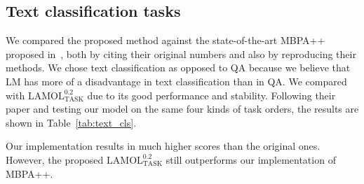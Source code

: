 \documentclass{article} %
\begin{document}


%

\subsection{Text classification tasks}
We compared the proposed method against the state-of-the-art MBPA++ proposed in~\citet{d2019episodic}, both by citing their original numbers and also by reproducing their methods.
We chose text classification as opposed to QA because we believe that LM has more of a disadvantage in text classification than in QA.
We compared with $\text{LAMOL}_{\text{TASK}}^{0.2}$ due to its good performance and stability.
Following their paper and testing our model on the same four kinds of task orders, the results are shown in Table~\ref{tab:text_cls}.

Our implementation results in much higher scores than the original ones.
However, the proposed $\text{LAMOL}_{\text{TASK}}^{0.2}$ still outperforms our implementation of MBPA++.



\end{document}
